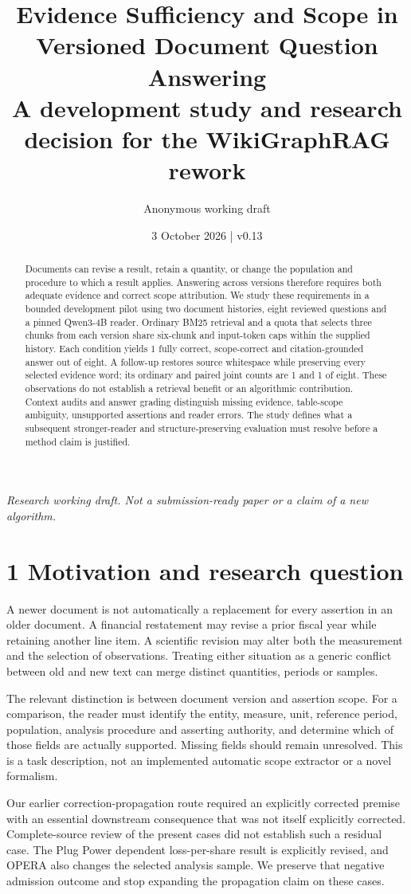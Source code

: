 \documentclass[11pt]{article}
\title{Evidence Sufficiency and Scope in Versioned Document Question Answering\\\large A development study and research decision for the WikiGraphRAG rework}
\author{Anonymous working draft}
\date{3 October 2026 | v0.13}
\begin{document}
\maketitle
\noindent\textit{Research working draft. Not a submission-ready paper or a claim of a new algorithm.}
\begin{abstract}
Documents can revise a result, retain a quantity, or change the population and procedure to which a result applies. Answering across versions therefore requires both adequate evidence and correct scope attribution. We study these requirements in a bounded development pilot using two document histories, eight reviewed questions and a pinned Qwen3-4B reader. Ordinary BM25 retrieval and a quota that selects three chunks from each version share six-chunk and input-token caps within the supplied history. Each condition yields 1 fully correct, scope-correct and citation-grounded answer out of eight. A follow-up restores source whitespace while preserving every selected evidence word; its ordinary and paired joint counts are 1 and 1 of eight. These observations do not establish a retrieval benefit or an algorithmic contribution. Context audits and answer grading distinguish missing evidence, table-scope ambiguity, unsupported assertions and reader errors. The study defines what a subsequent stronger-reader and structure-preserving evaluation must resolve before a method claim is justified.
\end{abstract}
\section*{1  Motivation and research question}
A newer document is not automatically a replacement for every assertion in an older document. A financial restatement may revise a prior fiscal year while retaining another line item. A scientific revision may alter both the measurement and the selection of observations. Treating either situation as a generic conflict between old and new text can merge distinct quantities, periods or samples.

The relevant distinction is between document version and assertion scope. For a comparison, the reader must identify the entity, measure, unit, reference period, population, analysis procedure and asserting authority, and determine which of those fields are actually supported. Missing fields should remain unresolved. This is a task description, not an implemented automatic scope extractor or a novel formalism.

Our earlier correction-propagation route required an explicitly corrected premise with an essential downstream consequence that was not itself explicitly corrected. Complete-source review of the present cases did not establish such a residual case. The Plug Power dependent loss-per-share result is explicitly revised, and OPERA also changes the selected analysis sample. We preserve that negative admission outcome and stop expanding the propagation claim on these cases.
\end{document}
